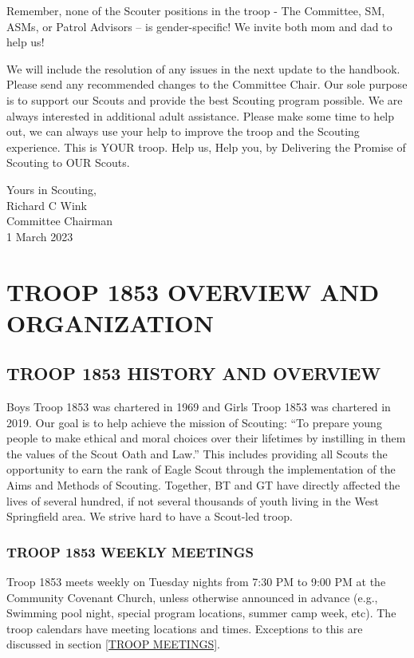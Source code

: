 \documentclass{ltxguide}
\begin{document}
Remember, none of the Scouter positions in the troop - The Committee, \ac{SM}, \acp{ASM}, or Patrol Advisors -- is gender-specific! We invite both mom and dad to help us!

We will include the resolution of any issues in the next update to the handbook. Please send any recommended changes to the Committee Chair. Our sole purpose is to support our Scouts and provide the best Scouting program possible. We are always interested in additional adult assistance. Please make some time to help out, we can always use your help to improve the troop and the Scouting experience. This is YOUR troop. Help us, Help you, by Delivering the Promise of Scouting to OUR Scouts.



Yours in Scouting,\\ 
Richard C Wink\\ 
Committee Chairman\\ 
1 March 2023

\newpage
\tableofcontents

\newpage


\section{TROOP 1853 OVERVIEW AND ORGANIZATION}

\subsection{TROOP 1853 HISTORY AND OVERVIEW}
Boys Troop 1853 was chartered in 1969 and Girls Troop 1853 was chartered in 2019. Our goal is to help achieve the mission of Scouting: “To prepare young people to make ethical and moral choices over their lifetimes by instilling in them the values of the Scout Oath and Law.” This includes providing all Scouts the opportunity to earn the rank of Eagle Scout through the implementation of the Aims and Methods of Scouting. Together, \ac{BT} and \ac{GT} have directly affected the lives of several hundred, if not several thousands of youth living in the West Springfield area. We strive hard to have a Scout-led troop.

\subsubsection{TROOP 1853 WEEKLY MEETINGS}
Troop 1853 meets weekly on Tuesday nights from 7:30 PM to 9:00 PM at the Community Covenant Church, unless otherwise announced in advance (e.g., Swimming pool night, special program locations, summer camp week, etc). The troop calendars have meeting locations and times. Exceptions to this are discussed in section \ref{TROOP MEETINGS}.
\end{document}
